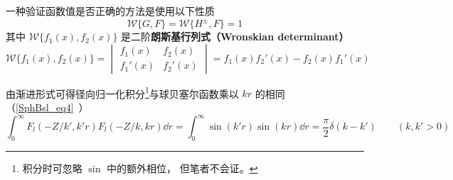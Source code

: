 一种验证函数值是否正确的方法是使用以下性质
\begin{equation}
\mathcal{W}\{G, F\} = \mathcal{W}\{H^\pm, F\} = 1
\end{equation}
其中 $\mathcal{W}\{f_1(x), f_2(x)\}$ 是二阶\textbf{朗斯基行列式（Wronskian determinant）}
\begin{equation}
\mathcal{W}\{f_1(x), f_2(x)\} = \begin{vmatrix}
f_1(x)  & f_2(x) \\
f_1'(x) & f_2'(x)
\end{vmatrix} = f_1(x) f_2'(x) - f_2(x) f_1'(x)
\end{equation}


由渐进形式可得径向归一化积分\footnote{积分时可忽略 $\sin$ 中的额外相位， 但笔者不会证。}与球贝塞尔函数乘以 $kr$ 的相同（\autoref{SphBsl_eq4}~）
\begin{equation}
\int_0^\infty F_l(-Z/k', k' r)F_l(-Z/k, kr) \dd{r} = \int_0^\infty \sin(k'r)\sin(kr) \dd{r} = \frac{\pi}{2}\delta(k - k') \qquad (k, k' > 0)
\end{equation}
